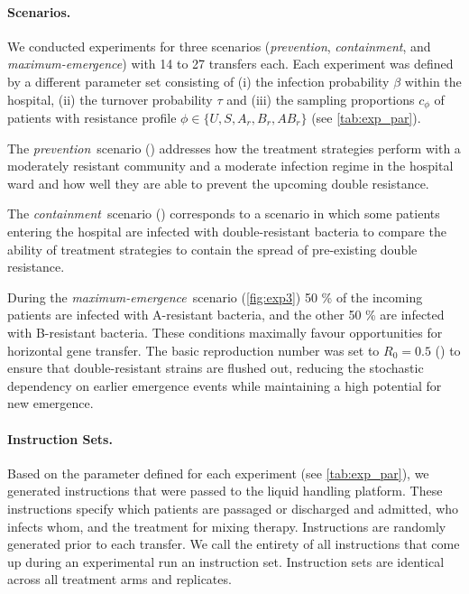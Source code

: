 \paragraph{Scenarios.}
We conducted experiments for three scenarios (\textit{prevention}, \textit{containment}, and \textit{maximum-emergence}) with 14 to 27 transfers each.
Each experiment was defined by a different parameter set consisting of (i) the infection probability $\beta$ within the hospital, (ii) the turnover probability $\tau$ and (iii) the sampling proportions $c_\phi$ of patients with resistance profile $\phi \in \{U, S, A_r, B_r, AB_r\}$ (see \autoref{tab:exp_par}).

The \textit{prevention}~scenario () addresses how the treatment strategies perform with a moderately resistant community and a moderate infection regime in the hospital ward and how well they are able to prevent the upcoming double resistance. 

The \textit{containment}~scenario () corresponds to a scenario in which some patients entering the hospital are infected with double-resistant bacteria to compare the ability of treatment strategies to contain the spread of pre-existing double resistance.

During the \textit{maximum-emergence}~scenario (\autoref{fig:exp3}) 50 \% of the incoming patients are infected with A-resistant bacteria, and the other 50 \% are infected with B-resistant bacteria. These conditions maximally favour opportunities for horizontal gene transfer.
The basic reproduction number was set to $R_0 = 0.5$ () to ensure that double-resistant strains are flushed out, reducing the stochastic dependency on earlier emergence events while maintaining a high potential for new emergence.


\paragraph{Instruction Sets.}
Based on the parameter defined for each experiment (see \autoref{tab:exp_par}), we generated instructions that were passed to the liquid handling platform.
These instructions specify which patients are passaged or discharged and admitted, who infects whom, and the treatment for mixing therapy. 
Instructions are randomly generated prior to each transfer. 
We call the entirety of all instructions that come up during an experimental run an instruction set.
Instruction sets are identical across all treatment arms and replicates.



